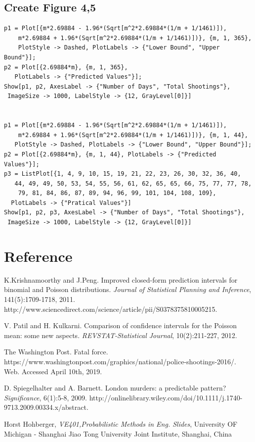 \documentclass[a4paper]{article}
\begin{document}
{{  \subsection{Create Figure 4,5}
  \begin{verbatim}
p1 = Plot[{m*2.69884 - 1.96*(Sqrt[m^2*2.69884*(1/m + 1/1461)]), 
    m*2.69884 + 1.96*(Sqrt[m^2*2.69884*(1/m + 1/1461)])}, {m, 1, 365},
    PlotStyle -> Dashed, PlotLabels -> {"Lower Bound", "Upper Bound"}];
p2 = Plot[{2.69884*m}, {m, 1, 365}, 
   PlotLabels -> {"Predicted Values"}];
Show[p1, p2, AxesLabel -> {"Number of Days", "Total Shootings"}, 
 ImageSize -> 1000, LabelStyle -> {12, GrayLevel[0]}]


p1 = Plot[{m*2.69884 - 1.96*(Sqrt[m^2*2.69884*(1/m + 1/1461)]), 
    m*2.69884 + 1.96*(Sqrt[m^2*2.69884*(1/m + 1/1461)])}, {m, 1, 44}, 
   PlotStyle -> Dashed, PlotLabels -> {"Lower Bound", "Upper Bound"}];
p2 = Plot[{2.69884*m}, {m, 1, 44}, PlotLabels -> {"Predicted Values"}];
p3 = ListPlot[{1, 4, 9, 10, 15, 19, 21, 22, 23, 26, 30, 32, 36, 40, 
   44, 49, 49, 50, 53, 54, 55, 56, 61, 62, 65, 65, 66, 75, 77, 77, 78,
    79, 81, 84, 86, 87, 89, 94, 96, 99, 101, 104, 108, 109}, 
  PlotLabels -> {"Pratical Values"}]
Show[p1, p2, p3, AxesLabel -> {"Number of Days", "Total Shootings"}, 
 ImageSize -> 1000, LabelStyle -> {12, GrayLevel[0]}]
\end{verbatim}
\newpage
\section{Reference}
\begin{thebibliography}{9}
K.Krishnamoorthy and J.Peng. Improved closed-form prediction intervals for binomial and Poisson distributions. \emph{Journal of Statistical Planning and Inference}, 141(5):1709-1718, 2011. http://www.sciencedirect.com/science/article/pii/S0378375810005215.

V. Patil and H. Kulkarni. Comparison of confidence intervals for the Poisson mean: some new aspects. \emph{REVSTAT-Statistical Journal},  10(2):211-227, 2012.

The Washington Post. Fatal force. https://www.washingtonpost.com/graphics/national/police-shootings-2016/. Web. Accessed April 10th, 2019.

D. Spiegelhalter and A. Barnett. London murders: a predictable pattern? \emph{Significance}, 6(1):5-8, 2009. http://onlinelibrary.wiley.com/doi/10.1111/j.1740-9713.2009.00334.x/abstract.

Horst Hohberger, \emph{VE401,Probabilistic Methods in Eng. Slides}, University OF Michigan - Shanghai Jiao Tong University Joint Institute, Shanghai, China
\end{thebibliography}
}}
\end{document}
